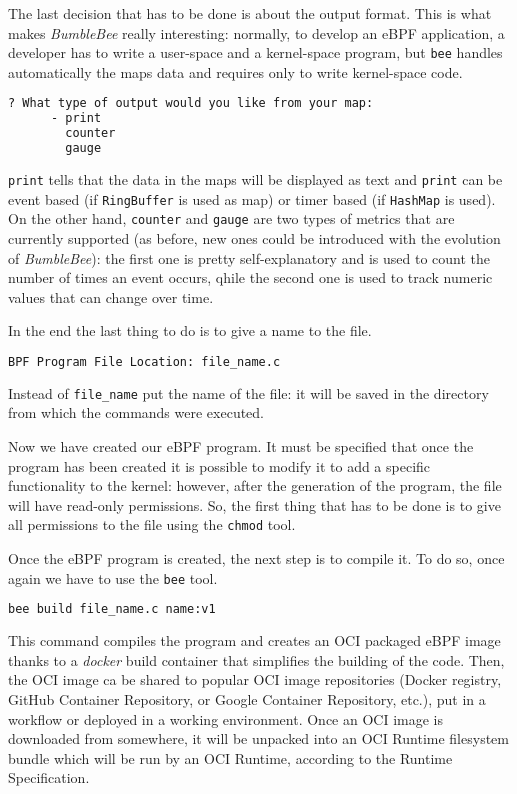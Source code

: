 The last decision that has to be done is about the output format.
This is what makes \textit{BumbleBee} really interesting: normally, to develop an eBPF application, a developer has to write a user-space and a kernel-space program, but \verb|bee| handles automatically the maps data and requires only to write kernel-space code.

\begin{lstlisting}[language=bash, caption={bee output format selection}]
	? What type of output would you like from your map: 
	  - print
	    counter
	    gauge
\end{lstlisting}

\verb|print| tells that the data in the maps will be displayed as text and \verb|print| can be event based (if \verb|RingBuffer| is used as map) or timer based (if \verb|HashMap| is used).
On the other hand, \verb|counter| and \verb|gauge| are two types of metrics that are currently supported (as before, new ones could be introduced with the evolution of \textit{BumbleBee}): the first one is pretty self-explanatory and is used to count the number of times an event occurs, qhile the second one is used to track numeric values that can change over time.

In the end the last thing to do is to give a name to the file.

\begin{lstlisting}[language=bash, caption={bee file location}]
	BPF Program File Location: file_name.c
\end{lstlisting}

Instead of \verb|file_name| put the name of the file: it will be saved in the directory from which the commands were executed.

Now we have created our eBPF program.
It must be specified that once the program has been created it is possible to modify it to add a specific functionality to the kernel: however, after the generation of the program, the file will have read-only permissions.
So, the first thing that has to be done is to give all permissions to the file using the \verb|chmod| tool.

Once the eBPF program is created, the next step is to compile it.
To do so, once again we have to use the \verb|bee| tool.

\begin{lstlisting}[language=bash, caption={bee built command}]
	bee build file_name.c name:v1
\end{lstlisting}

This command compiles the program and creates an OCI packaged eBPF image thanks to a \textit{docker} build container that simplifies the building of the code.
Then, the OCI image ca be shared to popular OCI image repositories (Docker registry, GitHub Container Repository, or Google Container Repository, etc.), put in a workflow or deployed in a working environment.
Once an OCI image is downloaded from somewhere, it will be unpacked into an OCI Runtime filesystem bundle which will be run by an OCI Runtime, according to the Runtime Specification.


